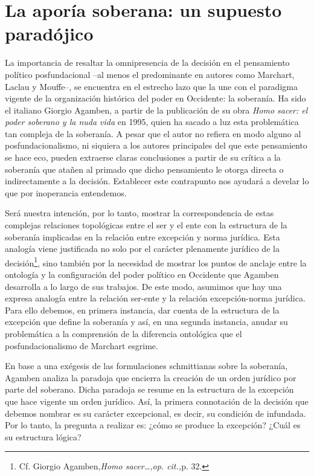 \section{La aporía soberana: un supuesto paradójico}

La importancia de resaltar la omnipresencia de la decisión en el
pensamiento político posfundacional --al menos el predominante en
autores como Marchart, Laclau y Mouffe--, se encuentra en el estrecho
lazo que la une con el paradigma vigente de la organización histórica
del poder en Occidente: la soberanía. Ha sido el italiano Giorgio
Agamben, a partir de la publicación de su obra \emph{Homo sacer: el
poder soberano y la nuda vida} en 1995, quien ha sacado a luz esta
problemática tan compleja de la soberanía. A pesar que el autor no
refiera en modo alguno al posfundacionalismo, ni siquiera a los autores
principales del que este pensamiento se hace eco, pueden extraerse
claras conclusiones a partir de su crítica a la soberanía que atañen al
primado que dicho pensamiento le otorga directa o indirectamente a la
decisión. Establecer este contrapunto nos ayudará a develar lo que por
inoperancia entendemos.

Será nuestra intención, por lo tanto, mostrar la correspondencia de
estas complejas relaciones topológicas entre el ser y el ente con la
estructura de la soberanía implicadas en la relación entre excepción y
norma jurídica. Esta analogía viene justificada no solo por el carácter
plenamente jurídico de la decisión\footnote{Cf. Giorgio
  Agamben,\emph{Homo sacer\ldots,op. cit.,}p. 32.}, sino también por la
necesidad de mostrar los puntos de anclaje entre la ontología y la
configuración del poder político en Occidente que Agamben desarrolla a
lo largo de sus trabajos. De este modo, asumimos que hay una expresa
analogía entre la relación ser-ente y la relación excepción-norma
jurídica. Para ello debemos, en primera instancia, dar cuenta de la
estructura de la excepción que define la soberanía y así, en una segunda
instancia, anudar su problemática a la comprensión de la diferencia
ontológica que el posfundacionalismo de Marchart esgrime.

En base a una exégesis de las formulaciones schmittianas sobre la
soberanía, Agamben analiza la paradoja que encierra la creación de un
orden jurídico por parte del soberano. Dicha paradoja se resume en la
estructura de la excepción que hace vigente un orden jurídico. Así, la
primera connotación de la decisión que debemos nombrar es su carácter
excepcional, es decir, su condición de infundada. Por lo tanto, la
pregunta a realizar es: ¿cómo se produce la excepción? ¿Cuál es su
estructura lógica?

